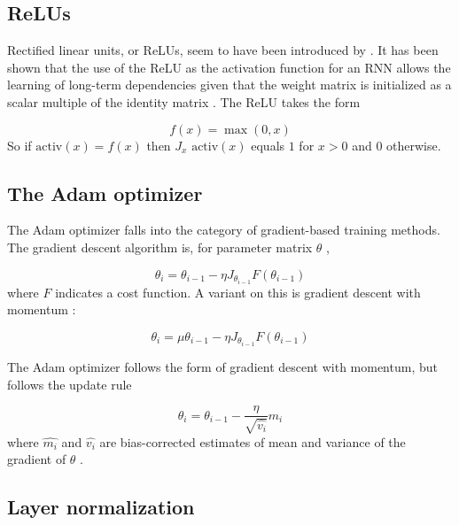 \subsection{ReLUs}

Rectified linear units, or ReLUs, seem to have been introduced by \citealt{hahnloser2000digital}. It has been shown that the use of the ReLU as the activation function for an RNN allows the learning of long-term dependencies given that the weight matrix is initialized as a scalar multiple of the identity matrix \cite[p. 2]{DBLP:journals/corr/LeJH15}. The ReLU takes the form

\begin{equation*}
f(x) = \max(0, x)
\end{equation*}
%
So if $\mbox{activ}(x) = f(x)$ then $J_{x}\mbox{ activ}(x)$ equals $1$ for $x > 0$ and $0$ otherwise.

\subsection{The Adam optimizer}

The Adam optimizer falls into the category of gradient-based training methods. The gradient descent algorithm is, for parameter matrix $\theta$ \cite[p. 4]{sutskever2013training},

\begin{equation*}
\theta_i = \theta_{i-1} - \eta J_{\theta_{i-1}} F(\theta_{i-1})
\end{equation*}
%
where $F$ indicates a cost function. A variant on this is gradient descent with momentum \cite[p. 5]{sutskever2013training}:

\begin{equation*}
\theta_i = \mu \theta_{i-1} - \eta J_{\theta_{i-1}} F(\theta_{i-1})
\end{equation*}

The Adam optimizer follows the form of gradient descent with momentum, but follows the update rule

\begin{equation*}
  \theta_i = \theta_{i-1} - \frac{\eta}{\sqrt{\widehat{v_i}}}\widehat{m_i}
\end{equation*}
%
where $\widehat{m_i}$ and $\widehat{v_i}$ are bias-corrected estimates of mean and variance of the gradient of $\theta$ \cite{DBLP:journals/corr/KingmaB14}.

\subsection{Layer normalization}

